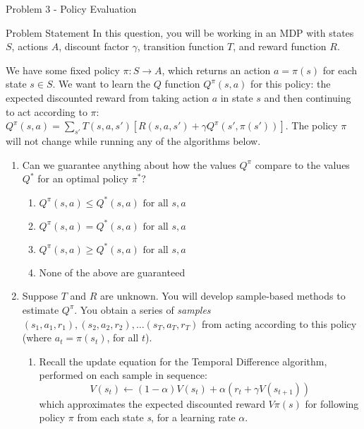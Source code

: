 \begin{problem}{Problem 3 - Policy Evaluation}
    \begin{statement}{Problem Statement}
        In this question, you will be working in an MDP with states $S$, actions $A$, discount factor $\gamma$, transition function $T$, and reward function $R$.

        We have some fixed policy $\pi : S \rightarrow A$, which returns an action $a = \pi(s)$ for each state $s \in S$. We want to learn the $Q$ function $Q^{\pi}(s,a)$ for this policy: the expected 
        discounted reward from taking action $a$ in state $s$ and then continuing to act according to $\pi$: $Q^{\pi}(s,a) = \sum_{s'} T(s,a,s')[R(s,a,s') + \gamma Q^{\pi}(s', \pi(s'))]$. The policy 
        $\pi$ will not change while running any of the algorithms below.

        \begin{enumerate}[label=(\alph*)]
            \item Can we guarantee anything about how the values $Q^{\pi}$ compare to the values $Q^{*}$ for an optimal policy $π^{*}$?
            \begin{enumerate}[label=\(\circ\)]
                \item $Q^{\pi}(s, a) \leq Q^{*}(s, a) \text{ for all } s, a$
                \item $Q^{\pi}(s, a) = Q^{*}(s, a) \text{ for all } s, a$
                \item $Q^{\pi}(s, a) \geq Q^{*}(s, a) \text{ for all } s, a$
                \item None of the above are guaranteed
            \end{enumerate}
            \item Suppose $T$ and $R$ are unknown. You will develop sample-based methods to estimate $Q^{\pi}$. You obtain a series of \textit{samples} $(s_{1}, a_{1}, r_{1}), (s_{2}, a_{2}, r_{2}), \dots (s_{T}, a_{T}, r_{T})$ 
            from acting according to this policy (where $a_{t} = \pi(s_{t})$, for all $t$).
            \begin{enumerate}[label=(\roman*)]
                \item Recall the update equation for the Temporal Difference algorithm, performed on each sample in sequence:
                \begin{equation*}
                    V(s_{t}) \leftarrow (1 - \alpha)V(s_{t}) + \alpha(r_{t} + \gamma V(s_{t + 1}))
                \end{equation*}
                which approximates the expected discounted reward $V\pi(s)$ for following policy $\pi$ from each state \textit{s}, for a learning rate $\alpha$.


\end{enumerate}
\end{enumerate}
\end{statement}
\end{problem}
